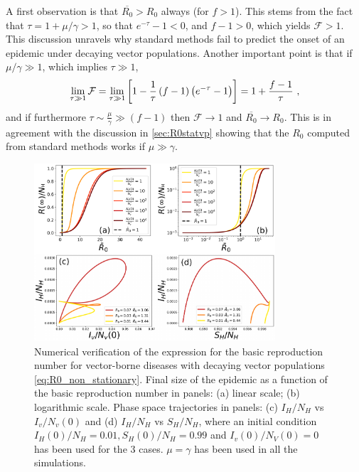 A first observation is that $\overline{R_0}>R_0$ always (for $f>1$). This
stems from the fact that $\tau=1+\mu/\gamma>1$, so that $e^{-\tau}-1<0$, and
$f-1>0$, which yields $\mathcal{F}>1$. This discussion unravels why standard
methods fail to predict the onset of an epidemic under decaying vector
populations. Another important point is that if $\mu/\gamma\gg 1$, which
implies $\tau\gg1$,
\begin{equation}
    \lim_{\tau\gg1}\mathcal{F}=\lim_{\tau\gg1}\left[1-\frac{1}{\tau}
        \left(f-1\right)\left(e^{-\tau}-1\right)\right]=1+\frac{f-1}{\tau}\
    ,
\end{equation}
and if furthermore $\tau\sim\frac{\mu}{\gamma}\gg (f-1)$ then
$\mathcal{F}\to 1$ and $\overline{R_0}\to R_0$. This is in agreement with the
discussion in \cref{sec:R0statvp} showing that the $R_0$ computed from standard
methods works if $\mu\gg\gamma$.

\begin{figure}[H]
    \centering
    \includegraphics[width=0.8\textwidth]{Figures/R0_check_mean_value.pdf}
    \caption[Numerical verification of the expression for the non-stationaty
        basic reproduction number]{Numerical verification of the expression for
        the basic reproduction number for vector-borne diseases with decaying
        vector populations \cref{eq:R0_non_stationary}. Final size of the
        epidemic as a function of the basic reproduction number in panels: (a)
        linear scale; (b) logarithmic scale. Phase space trajectories in
        panels: (c) $I_H/N_H$ vs $I_v/N_v(0)$ and (d) $I_H/N_H$ vs $S_H/N_H$,
        where an initial condition $I_H(0)/N_H=0.01, S_H(0)/N_H=0.99$ and
        $I_v(0)/N_V(0)=0$ has been used for the $3$ cases.
        $\mu=\gamma$ has been used in all the simulations.}
    \label{fig:R0_check_mean_value}
\end{figure}


